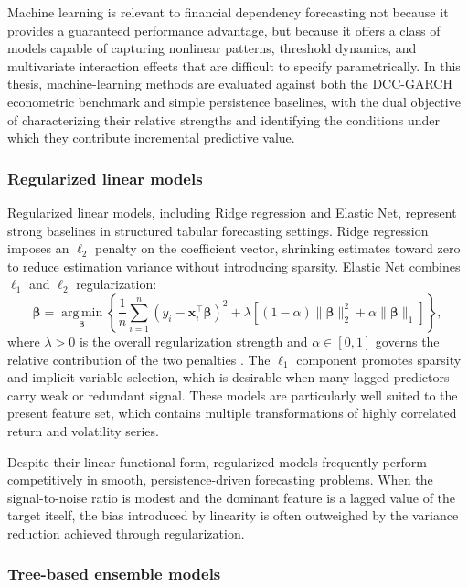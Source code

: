 Machine learning is relevant to financial dependency forecasting not because it provides a guaranteed performance advantage, but because it offers a class of models capable of capturing nonlinear patterns, threshold dynamics, and multivariate interaction effects that are difficult to specify parametrically. In this thesis, machine-learning methods are evaluated against both the DCC-GARCH econometric benchmark and simple persistence baselines, with the dual objective of characterizing their relative strengths and identifying the conditions under which they contribute incremental predictive value.

\subsubsection{Regularized linear models}

Regularized linear models, including Ridge regression and Elastic Net, represent strong baselines in structured tabular forecasting settings. Ridge regression imposes an $\ell_2$ penalty on the coefficient vector, shrinking estimates toward zero to reduce estimation variance without introducing sparsity. Elastic Net combines $\ell_1$ and $\ell_2$ regularization:
\begin{equation}
    \hat{\boldsymbol{\beta}} = \operatorname*{arg\,min}_{\boldsymbol{\beta}} \left\{
        \frac{1}{n}\sum_{i=1}^{n}(y_i - \mathbf{x}_i^{\top}\boldsymbol{\beta})^2
        + \lambda \left[(1-\alpha)\|\boldsymbol{\beta}\|_2^2 + \alpha\|\boldsymbol{\beta}\|_1\right]
    \right\},
\end{equation}
where $\lambda > 0$ is the overall regularization strength and $\alpha \in [0,1]$ governs the relative contribution of the two penalties \cite{zou2005}. The $\ell_1$ component promotes sparsity and implicit variable selection, which is desirable when many lagged predictors carry weak or redundant signal. These models are particularly well suited to the present feature set, which contains multiple transformations of highly correlated return and volatility series.

Despite their linear functional form, regularized models frequently perform competitively in smooth, persistence-driven forecasting problems. When the signal-to-noise ratio is modest and the dominant feature is a lagged value of the target itself, the bias introduced by linearity is often outweighed by the variance reduction achieved through regularization.

\subsubsection{Tree-based ensemble models}

